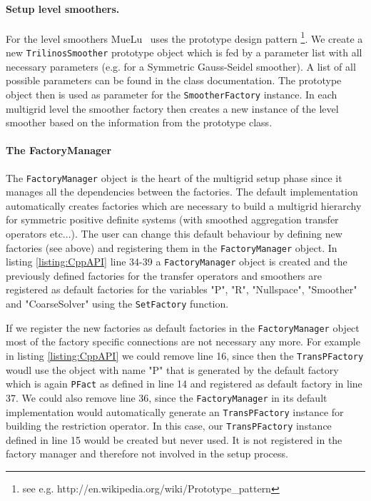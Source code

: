 \documentclass[12pt,a4paper]{article}
\newcommand{\MueLu}{MueLu}
\begin{document}
\paragraph{Setup level smoothers.}
For the level smoothers \MueLu~ uses the prototype design pattern \footnote{see e.g. http://en.wikipedia.org/wiki/Prototype\_pattern}.
We create a new \verb|TrilinosSmoother| prototype object which is fed by a parameter list with all necessary parameters (e.g. for a Symmetric Gauss-Seidel smoother). A list of all possible parameters can be found in the class documentation.
The prototype object then is used as parameter for the \verb|SmootherFactory| instance. In each multigrid level the smoother factory then creates a new instance of the level smoother based on the information from the prototype class.

\paragraph{The FactoryManager}
The \verb|FactoryManager| object is the heart of the multigrid setup phase since it manages all the dependencies between the factories. The default implementation automatically creates factories which are necessary to build a multigrid hierarchy for symmetric positive definite systems (with smoothed aggregation transfer operators etc...). The user can change this default behaviour by defining new factories (see above) and registering them in the \verb|FactoryManager| object. In listing \ref{listing:CppAPI} line 34-39 a \verb|FactoryManager| object is created and the previously defined factories for the transfer operators and smoothers are registered as default factories for the variables "P", "R", "Nullspace", "Smoother" and "CoarseSolver" using the \verb|SetFactory| function.

If we register the new factories as default factories in the \verb|FactoryManager| object most of the factory specific connections are not necessary any more. For example in listing \ref{listing:CppAPI} we could remove line 16, since then the \verb|TransPFactory| woudl use the object with name "P" that is generated by the default factory which is again \verb|PFact| as defined in line 14 and registered as default factory in line 37. We could also remove line 36, since the \verb|FactoryManager| in its default implementation would automatically generate an \verb|TransPFactory| instance for building the restriction operator. In this case, our \verb|TransPFactory| instance defined in line 15 would be created but never used. It is not registered in the factory manager and therefore not involved in the setup process.
\end{document}
